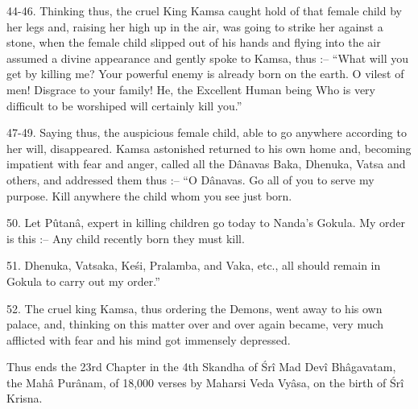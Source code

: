 44-46. Thinking thus, the cruel King Kamsa caught hold of that female child by her legs and, raising her high up in the air, was going to strike her against a stone, when the female child slipped out of his hands and flying into the air assumed a divine appearance and gently spoke to Kamsa, thus :-- ``What will you get by killing me? Your powerful enemy is already born on the earth. O vilest of men! Disgrace to your family! He, the Excellent Human being Who is very difficult to be worshiped will certainly kill you.''

47-49. Saying thus, the auspicious female child, able to go anywhere according to her will, disappeared. Kamsa astonished returned to his own home and, becoming impatient with fear and anger, called all the D\^anavas Baka, Dhenuka, Vatsa and others, and addressed them thus :-- ``O D\^anavas. Go all of you to serve my purpose. Kill anywhere the child whom you see just born.

50. Let Pûtan\^a, expert in killing children go today to Nanda's Gokula. My order is this :-- Any child recently born they must kill.

51. Dhenuka, Vatsaka, Ke\'si, Pralamba, and Vaka, etc., all should remain in Gokula to carry out my order.''

52. The cruel king Kamsa, thus ordering the Demons, went away to his own palace, and, thinking on this matter over and over again became, very much afflicted with fear and his mind got immensely depressed.

Thus ends the 23rd Chapter in the 4th Skandha of \'Sr\^i Mad Dev\^i Bh\^agavatam, the Mah\^a Pur\^anam, of 18,000 verses by Maharsi Veda Vy\^asa, on the birth of \'Sr\^i Krisna.

